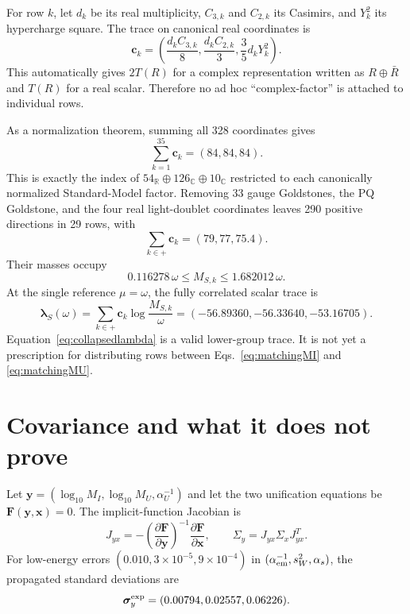 \documentclass[11pt]{article}
\begin{document}
For row $k$, let $d_k$ be its real multiplicity, $C_{3,k}$ and $C_{2,k}$
its Casimirs, and $Y_k^2$ its hypercharge square.  The trace on canonical
real coordinates is
\begin{equation}
 \bm c_k=\left(
 \frac{d_kC_{3,k}}8,
 \frac{d_kC_{2,k}}3,
 \frac35d_kY_k^2\right).
 \label{eq:rowtrace}
\end{equation}
This automatically gives $2T(R)$ for a complex representation written as
$R\oplus\bar R$ and $T(R)$ for a real scalar.  Therefore no ad hoc
``complex-factor'' is attached to individual rows.

As a normalization theorem, summing all 328 coordinates gives
\begin{equation}
 \sum_{k=1}^{35}\bm c_k=(84,84,84).
 \label{eq:universal84}
\end{equation}
This is exactly the index of
$54_{\mathbb R}\oplus126_{\mathbb C}\oplus10_{\mathbb C}$ restricted to
each canonically normalized Standard-Model factor.  Removing 33 gauge
Goldstones, the PQ Goldstone, and the four real light-doublet coordinates
leaves 290 positive directions in 29 rows, with
\begin{equation}
 \sum_{k\in +}\bm c_k=(79,77,75.4).
 \label{eq:positiveindices}
\end{equation}
Their masses occupy
\begin{equation}
 0.116278\,\omega\le M_{S,k}\le1.682012\,\omega.
 \label{eq:scalarband}
\end{equation}
At the single reference $\mu=\omega$, the fully correlated scalar trace is
\begin{equation}
 \bm\lambda_S(\omega)
 =\sum_{k\in+}\bm c_k\log\frac{M_{S,k}}\omega
 =(-56.89360,-56.33640,-53.16705).
 \label{eq:collapsedlambda}
\end{equation}
Equation~\eqref{eq:collapsedlambda} is a valid lower-group trace.  It is not
yet a prescription for distributing rows between Eqs.~\eqref{eq:matchingMI}
and \eqref{eq:matchingMU}.

\section{Covariance and what it does not prove}

Let $\bm y=(\log_{10}M_I,\log_{10}M_U,\alpha_U^{-1})$ and let the two
unification equations be $\bm F(\bm y,\bm x)=0$.  The implicit-function
Jacobian is
\begin{equation}
 J_{yx}=-\left(\frac{\partial\bm F}{\partial\bm y}\right)^{-1}
          \frac{\partial\bm F}{\partial\bm x},\qquad
 \Sigma_y=J_{yx}\Sigma_xJ_{yx}^{T}.
 \label{eq:covariance}
\end{equation}
For low-energy errors
$(0.010,3\times10^{-5},9\times10^{-4})$ in
$(\alpha_{\rm em}^{-1},s_W^2,\alpha_s)$, the propagated standard deviations
are
\begin{equation}
 \bm\sigma_y^{\rm exp}=(0.00794,0.02557,0.06226).
 \label{eq:expsigma}
\end{equation}
\end{document}
